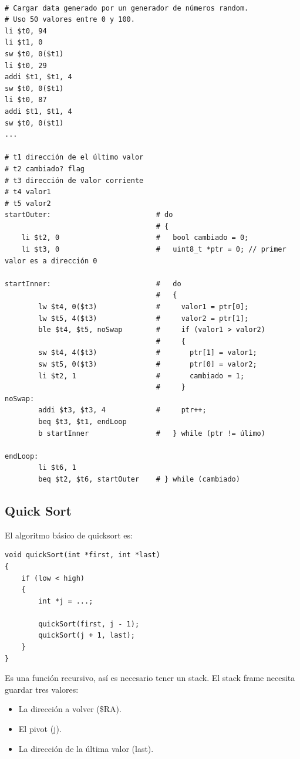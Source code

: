 \documentclass[a4paper]{article}
\begin{document}
\begin{verbatim}

# Cargar data generado por un generador de números random.
# Uso 50 valores entre 0 y 100.
li $t0, 94
li $t1, 0
sw $t0, 0($t1)
li $t0, 29
addi $t1, $t1, 4
sw $t0, 0($t1)
li $t0, 87
addi $t1, $t1, 4
sw $t0, 0($t1)
...

# t1 dirección de el último valor
# t2 cambiado? flag
# t3 dirección de valor corriente
# t4 valor1
# t5 valor2
startOuter:                         # do
                                    # {
    li $t2, 0                       #   bool cambiado = 0;
    li $t3, 0                       #   uint8_t *ptr = 0; // primer valor es a dirección 0

startInner:                         #   do
                                    #   {
        lw $t4, 0($t3)              #     valor1 = ptr[0];
        lw $t5, 4($t3)              #     valor2 = ptr[1];
        ble $t4, $t5, noSwap        #     if (valor1 > valor2)
                                    #     {
        sw $t4, 4($t3)              #       ptr[1] = valor1;
        sw $t5, 0($t3)              #       ptr[0] = valor2;
        li $t2, 1                   #       cambiado = 1;
                                    #     }
noSwap:
        addi $t3, $t3, 4            #     ptr++;
        beq $t3, $t1, endLoop
        b startInner                #   } while (ptr != úlimo)

endLoop:
        li $t6, 1
        beq $t2, $t6, startOuter    # } while (cambiado)
\end{verbatim}

\subsection{Quick Sort}

El algoritmo básico de quicksort es:

\begin{verbatim}
void quickSort(int *first, int *last)
{
    if (low < high)
    {
        int *j = ...;

        quickSort(first, j - 1);
        quickSort(j + 1, last);
    }
}
\end{verbatim}

Es una función recursivo, así es necesario tener un stack. El stack frame necesita guardar tres valores:

\begin{itemize}
    \item La dirección a volver (\$RA).
    \item El pivot (j).
    \item La dirección de la última valor (last).
\end{itemize}
\end{document}
